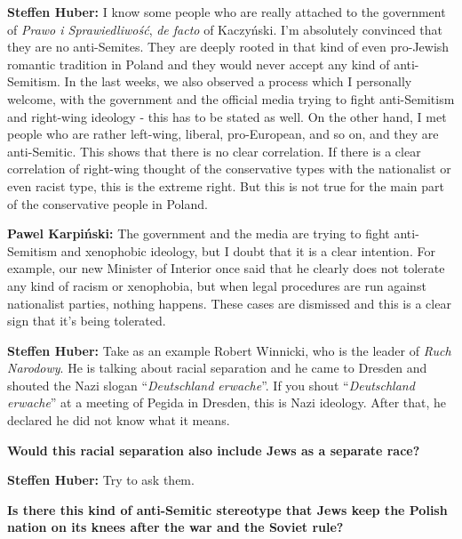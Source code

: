 \textbf{Steffen Huber:} I know some people who are really attached to the government of \textit{Prawo i Sprawiedliwość}, \textit{de facto} of Kaczyński. I'm absolutely convinced that they are no anti-Semites. They are deeply rooted in that kind of even pro-Jewish romantic tradition in Poland and they would never accept any kind of anti-Semitism. In the last weeks, we also observed a process which I personally welcome, with the government and the official media trying to fight anti-Semitism and right-wing ideology - this has to be stated as well. On the other hand, I met people who are rather left-wing, liberal, pro-European, and so on, and they are anti-Semitic. This shows that there is no clear correlation. If there is a clear correlation of right-wing thought of the conservative types with the nationalist or even racist type, this is the extreme right. But this is not true for the main part of the conservative people in Poland. \par
\textbf{Pawel Karpiński:} The government and the media are trying to fight anti-Semitism and xenophobic ideology, but I doubt that it is a clear intention. For example, our new Minister of Interior once said that he clearly does not tolerate any kind of racism or xenophobia, but when legal procedures are run against nationalist parties, nothing happens. These cases are dismissed and this is a clear sign that it’s being tolerated.\par
\textbf{Steffen Huber:} Take as an example Robert Winnicki, who is the leader of \textit{Ruch Narodowy}. He is talking about racial separation and he came to Dresden and shouted the Nazi slogan “\textit{Deutschland erwache}”. If you shout “\textit{Deutschland erwache}” at a meeting of Pegida in Dresden, this is Nazi ideology. After that, he declared he did not know what it means.  

\textbf{Would this racial separation also include Jews as a separate race?}

\textbf{Steffen Huber:} Try to ask them.  

\textbf{Is there this kind of anti-Semitic stereotype that Jews keep the Polish nation on its knees after the war and the Soviet rule?} 

